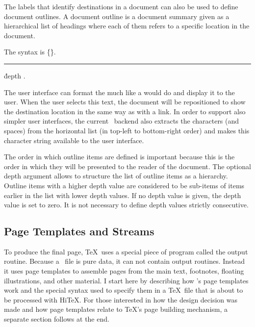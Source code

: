 The labels that identify destinations in a document can also be used
to define document outlines. A document outline is a document summary
given as a hierarchical list of headings where each of them
refers to a specific location in the document.

The syntax is
\medskip
\prim{}
  \.{\{}\.{\}}.
\medskip
{}
\rule {}: \.{depth} .
\medskip

The user interface can format the  much like 
a  would do and display it to the user. When the user selects
this text, the document will be repositioned to show the destination location
in the same way as with a link. In order to support also simpler
user interfaces, the current \HINT\ backend also extracts the characters
(and spaces) from the horizontal list (in top-left to bottom-right order)
and makes this character string available to the user interface.


The order in which outline items are defined is important because
this is the order in which they will be presented to the reader of the
document. The optional depth argument allows to structure 
the list of outline items as a hierarchy. Outline items with a higher depth value are considered to be sub-items of items earlier in the list with lower
depth values. If no depth value is given, the depth value is set to zero.
It is not necessary to define depth values strictly consecutive.


\subsection{Page Templates and Streams}

To produce the final page, \TeX\ uses a special piece of program
called the output routine.  Because a \HINT\
file is pure data, it can not contain output routines.  Instead it
uses page templates to assemble pages from the main text, footnotes,
floating illustrations, and other material.  I start here by
describing how \HINT's page templates work and the special syntax used
to specify them in a \TeX\ file that is about to be processed with
Hi\TeX.  For those interested in how the design decision was made and
how page templates relate to \TeX's page building mechanism, a
separate section follows at the end.

